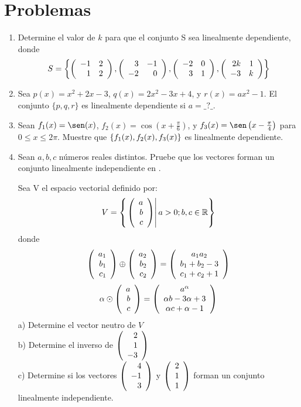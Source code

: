 \section{Problemas}
\begin{enumerate}


\item
Determine el valor de $k$ para que el conjunto S sea linealmente dependiente, donde $$S=\left\{ \left( \begin{array}{rr} -1&2\\ 1&2 \end{array} \right) ,  \left( \begin{array}{rr} 3&-1\\ -2&0 \end{array} \right) ,  \left( \begin{array}{rr} -2&0\\ 3&1 \end{array} \right) , \left( \begin{array}{rr} 2k&1\\ -3&k \end{array} \right) \right\}$$


\item
Sea $p(x)= x^2+2x-3$, $q(x)=2x^2-3x+4$, y $r(x)=ax^2-1$. El conjunto $\{p, q, r\}$ es
linealmente dependiente si $a=\_?\_$.

\item
Sean $f_1(x) = \sen(x)$, $f_2(x) = \cos\left(x+\frac{\pi}{6}\right)$, y $f_3(x) = \sen\left(x-\frac{\pi}{4}\right)$ para $0 \leq x \leq 2\pi$. Muestre que 
$ \left\{f_1(x), f_2(x), f_3(x) \right\} $ es linealmente dependiente.


\item
Sean $a, b, c$ números reales distintos. Pruebe que los vectores  forman un conjunto linealmente independiente en \rtres.



\begin{prob}[]
Sea V el espacio vectorial definido por:
\[V=\left\{ \left. \left( \begin{array}{r} a\\ b\\ c \end{array} \right) \right| a>0; b, c\in \mathbb{R} \right\}\]
donde
\[ \left( \begin{array}{r} a_1\\ b_1\\ c_1 \end{array} \right) \oplus\left( \begin{array}{r} a_2\\ b_2\\ c_2 \end{array} \right) =\left(
\begin{array}{c}
a_1a_2\\
b_1+b_2-3\\
c_1+c_2+1
\end{array}
\right)
\]
\[\alpha\odot\left( \begin{array}{r} a\\ b\\ c \end{array} \right) =\left(
\begin{array}{c}
a^\alpha\\
\alpha b-3\alpha+3\\
\alpha c+\alpha-1
\end{array}
\right)\]
a) Determine el vector neutro de $V$
~\\b) Determine el inverso de $\left( \begin{array}{r} 2\\ 1\\ -3 \end{array} \right) $
~\\c) Determine si los vectores $\left( \begin{array}{r} 4\\ -1\\ 3 \end{array} \right) $ y $\left( \begin{array}{r} 2\\ 1\\ 1 \end{array} \right) $ forman un conjunto linealmente independiente.


\end{prob}
\end{enumerate}
